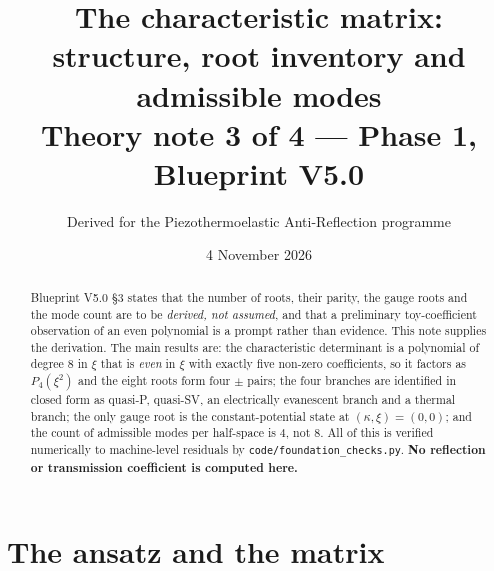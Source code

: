 \documentclass[11pt]{article}
\title{The characteristic matrix: structure, root inventory and\\
admissible modes\\
\large Theory note 3 of 4 --- Phase 1, Blueprint V5.0}
\author{Derived for the Piezothermoelastic Anti-Reflection programme}
\date{4 November 2026}
\theoremstyle{plain}
\begin{document}
\maketitle

\begin{abstract}
Blueprint V5.0 \S3 states that the number of roots, their parity, the gauge roots
and the mode count are to be \emph{derived, not assumed}, and that a preliminary
toy-coefficient observation of an even polynomial is a prompt rather than
evidence. This note supplies the derivation. The main results are: the
characteristic determinant is a polynomial of degree $8$ in $\xi$ that is
\emph{even} in $\xi$ with exactly five non-zero coefficients, so it factors as
$P_4(\xi^2)$ and the eight roots form four $\pm$ pairs; the four branches are
identified in closed form as quasi-P, quasi-SV, an electrically evanescent branch
and a thermal branch; the only gauge root is the constant-potential state at
$(\kappa,\xi)=(0,0)$; and the count of admissible modes per half-space is $4$,
not $8$. All of this is verified numerically to machine-level residuals by
\texttt{code/foundation\_checks.py}. \textbf{No reflection or transmission
coefficient is computed here.}
\end{abstract}

\section{The ansatz and the matrix}
\label{sec:ansatz}
\end{document}
